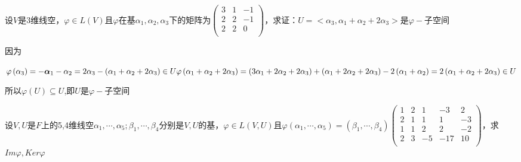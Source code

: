 \documentclass[lang=cn,10pt]{elegantbook}
\begin{document}
\begin{example}
	设$V$是3维线空，$\varphi\in L(V)$且$\varphi$在基$\alpha_1,\alpha_2,\alpha_3$下的矩阵为$\left(\begin{matrix}3&1&-1\\2&2&-1\\2&2&0\\\end{matrix}\right)$，求证：$U=<\alpha_3,\alpha_1+\alpha_2+2\alpha_3>$是$\varphi-$子空间
\end{example}
\begin{solution}
	
	因为
	
	$\varphi \left( \alpha _3 \right) =-\boldsymbol{\alpha }_1-\alpha _2=2\alpha _3-\left( \alpha _1+\alpha _2+2\alpha _3 \right) \in U
	\\
	\varphi \left( \alpha _1+\alpha _2+2\alpha _3 \right) =\left( 3\alpha _1+2\alpha _2+2\alpha _3 \right) +\left( \alpha _1+2\alpha _2+2\alpha _3 \right) -2\left( \alpha _1+\alpha _2 \right) =2\left( \alpha _1+\alpha _2+2\alpha _3 \right) \in U$
	
	所以$\varphi(U)\subseteq U $,即$U$是$\varphi-$子空间
	
\end{solution}
\begin{example}
	设$V,U$是$F$上的5,4维线空$\alpha_1,\cdots,\alpha_5;\beta_1,\cdots,\beta_4$分别是$V,U$的基，$\varphi\in L(V,U)$且$\varphi(\alpha_1,\cdots,\alpha_5)=(\beta_1,\cdots,\beta_4)$$\left(\begin{matrix}1&2&1&-3&2\\2&1&1&1&-3\\1&1&2&2&-2\\2&3&-5&-17&10\\\end{matrix}\right)$，求$Im{\varphi},Ker\varphi$
\end{example}
\end{document}
